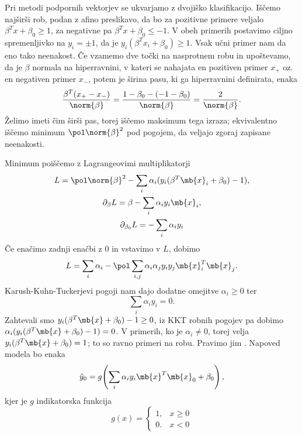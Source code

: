 
Pri metodi podpornih vektorjev se ukvarjamo z dvojiško klasifikacijo.
Iščemo najširši rob, podan z afino preslikavo, da bo za pozitivne primere
veljalo $\beta^T x + \beta_0 \ge 1$, za negativne pa $\beta^T x + \beta_0 \le
-1$.
V obeh primerih postavimo ciljno spremenljivko na $y_i = \pm 1$, da je
$y_i(\beta^T x_i + \beta_0) \ge 1$.
Vsak učni primer nam da eno tako neenakost.
Če vzamemo dve točki na nasprotnem robu in upoštevamo, da je $\beta$ normala na
hiperravnini, v kateri se nahajata en pozitiven primer $x_+$ oz. en negativen
primer $x_-$, potem je širina pasu, ki ga hiperravnini definirata, enaka
\[
  \frac{\beta^T (x_+ - x_-)}{\norm{\beta}}
  = \frac{1 - \beta_0 - (-1 - \beta_0)}{\norm{\beta}}
  = \frac{2}{\norm{\beta}}.
\]
Želimo imeti čim širši pas, torej iščemo maksimum tega izraza; ekvivalentno
iščemo minimum $\pol \norm{\beta}^2$ pod pogojem, da veljajo zgoraj zapisane
neenakosti.

Minimum poiščemo z Lagrangeovimi multiplikatorji
\begin{gather*}
  L = \pol \norm{\beta}^2 - \sum_i \alpha_i (y_i(\beta^T \mb{x}_i + \beta_0) - 1), \\
  \partial_\beta L = \beta - \sum_i \alpha_i y_i \mb{x}_i, \\
  \partial_{\beta_0} L = - \sum_i \alpha_i y_i
\end{gather*}
Če enačimo zadnji enačbi z $0$ in vstavimo v $L$, dobimo
\[
  L = \sum_i \alpha_i - \pol \sum_{i,j} \alpha_i \alpha_j y_i y_j \mb{x}_i^T
  \mb{x}_j.
\]
Karush-Kuhn-Tuckerjevi pogoji nam dajo dodatne omejitve $\alpha_i \ge 0$ ter
\[
  \sum_i \alpha_i y_i = 0.
\]
Zahtevali smo $y_i (\beta^T \mb{x} + \beta_0) -1 \ge 0$, iz KKT robnih pogojev pa
dobimo $\alpha_i (y_i (\beta^T \mb{x} + \beta_0) -1) = 0$.
V primerih, ko je $\alpha_i \ne 0$, torej velja $y_i (\beta^T \mb{x} + \beta_0)
= 1$; to so ravno primeri na robu.
Pravimo jim .
Napoved modela bo enaka
\[
  \hat{y}_0 = g\!\left( \sum_i \alpha_i y_i \mb{x}^T \mb{x}_0 + \beta_0 \right),
\]
kjer je $g$ indikatorska funkcija
\[
  g(x) =
  \begin{cases}
	1, & x \ge 0 \\
	0. & x < 0
  \end{cases}
\]


